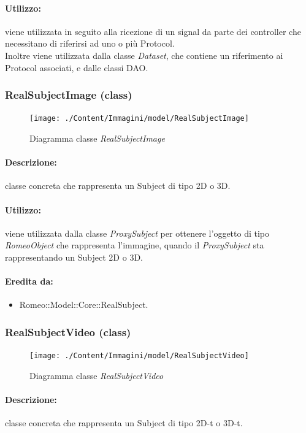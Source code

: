 	\paragraph{Utilizzo:} viene utilizzata in seguito alla ricezione di un signal\g{} da
parte dei controller che necessitano di riferirsi ad uno o più Protocol\g{}.
\\Inoltre viene utilizzata dalla classe \textsl{Dataset}, che contiene un riferimento ai Protocol\g{} associati, e dalle classi DAO.
	\subsubsection{RealSubjectImage (class)}
	\begin{figure}[!h]
		\centering
		\texttt{[image: ./Content/Immagini/model/RealSubjectImage]}
		\caption{Diagramma classe \textsl{RealSubjectImage}}
	\end{figure}
	\paragraph{Descrizione:} classe concreta che rappresenta un Subject\g{} di tipo 2D o 3D.
	\paragraph{Utilizzo:} viene utilizzata dalla classe \textsl{ProxySubject} per ottenere l'oggetto di tipo \textsl{RomeoObject} che rappresenta l'immagine, quando il \textsl{ProxySubject} sta rappresentando un Subject\g{} 2D o 3D.
	\paragraph{Eredita da:}
		\begin{itemize}
			\item Romeo::Model::Core::RealSubject.
		\end{itemize}
	\subsubsection{RealSubjectVideo (class)}
	\begin{figure}[!h]
		\centering
		\texttt{[image: ./Content/Immagini/model/RealSubjectVideo]}
		\caption{Diagramma classe \textsl{RealSubjectVideo}}
	\end{figure}
	\paragraph{Descrizione:} classe concreta che rappresenta un Subject\g{} di tipo 2D-t o 3D-t.
